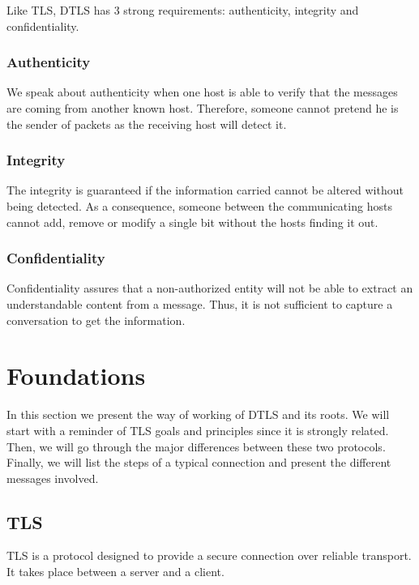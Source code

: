 Like TLS, DTLS has 3 strong requirements: authenticity, integrity and confidentiality.

\subsubsection{Authenticity}

We speak about authenticity when one host is able to verify that the messages are coming from another known host. Therefore, someone cannot pretend he is the sender of packets as the receiving host will detect it.

\subsubsection{Integrity}

The integrity is guaranteed if the information carried cannot be altered without being detected. As a consequence, someone between the communicating hosts cannot add, remove or modify a single bit without the hosts finding it out.


\subsubsection{Confidentiality}

Confidentiality assures that a non-authorized entity will not be able to extract an understandable content from a message. Thus, it is not sufficient to capture a conversation to get the information.

\section{Foundations}

In this section we present the way of working of DTLS and its roots. We will start with a reminder of TLS goals and principles since it is strongly related. Then, we will go through the major differences between these two protocols. Finally, we will list the steps of a typical connection and present the different messages involved.

\subsection{TLS}
\label{sec:tls}

TLS is a protocol designed to provide a secure connection over reliable transport. It takes place between a server and a client.

